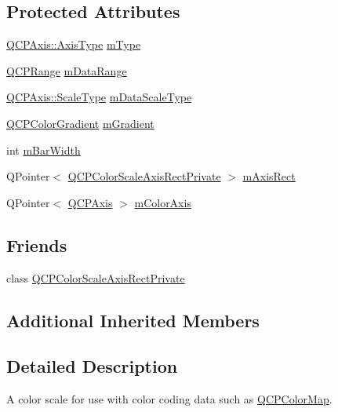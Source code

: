 \subsection*{Protected Attributes}
\begin{DoxyCompactItemize}
\item 
\hyperlink{classQCPAxis_ae2bcc1728b382f10f064612b368bc18a}{Q\+C\+P\+Axis\+::\+Axis\+Type} \hyperlink{classQCPColorScale_a7d47ed4ab76f38e50164e9d77fe33789}{m\+Type}
\item 
\hyperlink{classQCPRange}{Q\+C\+P\+Range} \hyperlink{classQCPColorScale_a5d4853feb32cd0077bb2b871687c844b}{m\+Data\+Range}
\item 
\hyperlink{classQCPAxis_a36d8e8658dbaa179bf2aeb973db2d6f0}{Q\+C\+P\+Axis\+::\+Scale\+Type} \hyperlink{classQCPColorScale_a2754d6a78736f64a241e333fbd955372}{m\+Data\+Scale\+Type}
\item 
\hyperlink{classQCPColorGradient}{Q\+C\+P\+Color\+Gradient} \hyperlink{classQCPColorScale_ae195a385032066b5c46cc3301af58922}{m\+Gradient}
\item 
int \hyperlink{classQCPColorScale_a409d2ab78dff1f92da5e6acfb062e811}{m\+Bar\+Width}
\item 
Q\+Pointer$<$ \hyperlink{classQCPColorScaleAxisRectPrivate}{Q\+C\+P\+Color\+Scale\+Axis\+Rect\+Private} $>$ \hyperlink{classQCPColorScale_a6e37f7d49cd614dc50ef1caae60461b9}{m\+Axis\+Rect}
\item 
Q\+Pointer$<$ \hyperlink{classQCPAxis}{Q\+C\+P\+Axis} $>$ \hyperlink{classQCPColorScale_a2efbc90fd31898fe05d2b74a8422b1d5}{m\+Color\+Axis}
\end{DoxyCompactItemize}
\subsection*{Friends}
\begin{DoxyCompactItemize}
\item 
class \hyperlink{classQCPColorScale_a1441d8c09d7227c0c29a8d0a96d55bfe}{Q\+C\+P\+Color\+Scale\+Axis\+Rect\+Private}
\end{DoxyCompactItemize}
\subsection*{Additional Inherited Members}


\subsection{Detailed Description}
A color scale for use with color coding data such as \hyperlink{classQCPColorMap}{Q\+C\+P\+Color\+Map}. 

